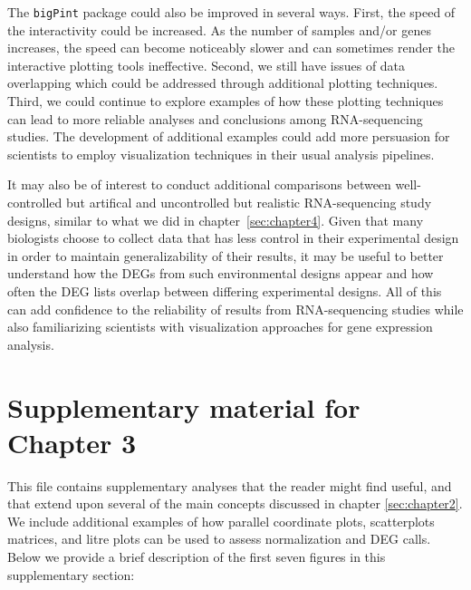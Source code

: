 \documentclass[11pt,a4paper,oldfontcommands,openany]{memoir}
\numberwithin{equation}{section} %
\newcommand{\pkg}[1]{{\texttt{#1}}}
\begin{document}
The \pkg{bigPint} package could also be improved in several ways. First, the speed of the interactivity could be increased. As the number of samples and/or genes increases, the speed can become noticeably slower and can sometimes render the interactive plotting tools ineffective. Second, we still have issues of data overlapping which could be addressed through additional plotting techniques. Third, we could continue to explore examples of how these plotting techniques can lead to more reliable analyses and conclusions among RNA-sequencing studies. The development of additional examples could add more persuasion for scientists to employ visualization techniques in their usual analysis pipelines.

It may also be of interest to conduct additional comparisons between well-controlled but artifical and uncontrolled but realistic RNA-sequencing study designs, similar to what we did in chapter~\ref{sec:chapter4}. Given that many biologists choose to collect data that has less control in their experimental design in order to maintain generalizability of their results, it may be useful to better understand how the DEGs from such environmental designs appear and how often the DEG lists overlap between differing experimental designs. All of this can add confidence to the reliability of results from RNA-sequencing studies while also familiarizing scientists with visualization approaches for gene expression analysis.



\chapter{Supplementary material for Chapter 3}
\label{sec:suppchapter2}

This file contains supplementary analyses that the reader might find useful, and that extend upon several of the main concepts discussed in chapter \ref{sec:chapter2}. We include additional examples of how parallel coordinate plots, scatterplots matrices, and litre plots can be used to assess normalization and DEG calls. Below we provide a brief description of the first seven figures in this supplementary section:
\end{document}
